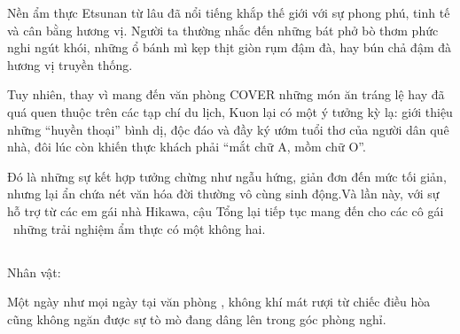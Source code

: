 \documentclass[../main.tex]{subfiles}
\begin{document}

Nền ẩm thực Etsunan từ lâu đã nổi tiếng khắp thế giới với sự phong phú, tinh tế và cân bằng hương vị. Người ta thường nhắc đến những bát phở bò thơm phức nghi ngút khói, những ổ bánh mì kẹp thịt giòn rụm đậm đà, hay bún chả đậm đà hương vị truyền thống.

Tuy nhiên, thay vì mang đến văn phòng COVER những món ăn tráng lệ hay đã quá quen thuộc trên các tạp chí du lịch, Kuon lại có một ý tưởng kỳ lạ: giới thiệu những ``huyền thoại'' bình dị, độc đáo và đầy ký ướm tuổi thơ của người dân quê nhà, đôi lúc còn khiến thực khách phải ``mắt chữ A, mồm chữ O''.

Đó là những sự kết hợp tưởng chừng như ngẫu hứng, giản đơn đến mức tối giản, nhưng lại ẩn chứa nét văn hóa đời thường vô cùng sinh động.Và lần này, với sự hỗ trợ từ các em gái nhà Hikawa, cậu Tổng lại tiếp tục mang đến cho các cô gái \hll\ những trải nghiệm ẩm thực có một không hai.

\vspace{-8pt}

\subsection*{\label{ep-C9.I}}
\vspace{-4pt}
\begin{center}
  {\caviar\fontsize{12pt}{12pt}\selectfont Nhân vật:     }
\end{center}

Một ngày như mọi ngày tại văn phòng \hll, không khí mát rượi từ chiếc điều hòa cũng không ngăn được sự tò mò đang dâng lên trong góc phòng nghỉ.
\end{document}
